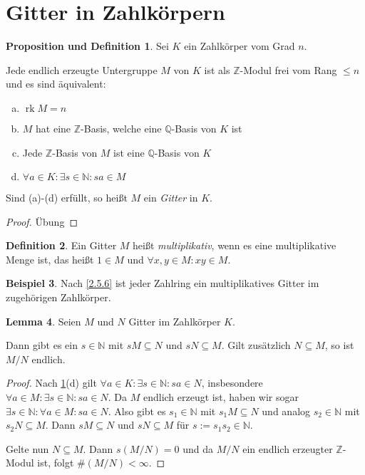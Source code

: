 \documentclass[
twoside=semi,
fontsize=12,
DIV=12, 
cleardoublepage=current,
leqno,
headings=optiontoheadandtoc, 
toc=idx
]{scrbook}
\newcommand{\N}{\mathbb{N}}
\newcommand{\Z}{\mathbb{Z}}
\newcommand{\Q}{\mathbb{Q}}
\DeclareMathOperator{\rk}{rk}
\theoremstyle{definition}
\newtheorem{definition}{Definition}[section]
\newtheorem{beispiel}[definition]{Beispiel}
\newtheorem{lemma}[definition]{Lemma}
\newtheorem{prop-def}[definition]{Proposition und Definition}
\begin{document}
 	\section{Gitter in Zahlk\"orpern}
 	\begin{prop-def}\label{3.1.1}
 		Sei $K$ ein Zahlk\"orper vom Grad $n$. 
 		
 		Jede endlich erzeugte Untergruppe $M$ von $K$ ist als $\Z$-Modul frei vom Rang $\leq n$ und es sind \"aquivalent:
 		\begin{enumerate}[(a)]
 			\item $\rk M = n$
 			\item $M$ hat eine $\Z$-Basis, welche eine $\Q$-Basis von $K$ ist
 			\item Jede $\Z$-Basis von $M$ ist eine $\Q$-Basis von $K$  
 			\item $\forall a \in K: \exists s \in \N: sa \in M$
 		\end{enumerate}
 		
 		Sind (a)-(d) erf\"ullt, so hei\ss t $M$ ein \emph{Gitter} in $K$.
 		\begin{proof}
 			\"Ubung
 		\end{proof}
 	\end{prop-def}
 
 	\begin{definition}\label{3.1.2}
 		Ein Gitter $M$ hei\ss t \emph{multiplikativ}, wenn es eine multiplikative Menge ist, das hei\ss t $1 \in M$ und $\forall x,y \in M: xy \in M$.
 	\end{definition}
 
 	\begin{beispiel}\label{3.1.3}
 		Nach \ref{2.5.6} ist jeder Zahlring ein multiplikatives Gitter im zugeh\"origen Zahlk\"orper.
 	\end{beispiel}
 
 	\begin{lemma}\label{3.1.4}
 		Seien $M$ und $N$ Gitter im Zahlk\"orper $K$. 
 		
 		Dann gibt es ein $s \in \N$ mit $sM \subseteq N$ und $sN \subseteq M$. Gilt zus\"atzlich $N \subseteq M$, so ist $M/N$ endlich.
 		
 		\begin{proof}
 			Nach \ref{3.1.1}(d) gilt $\forall a \in K: \exists s \in \N: sa \in N$, insbesondere $\forall a \in M: \exists s \in \N: sa \in N$. Da $M$ endlich erzeugt ist, haben wir sogar 
 			$\exists s \in \N: \forall a \in M: sa \in N$. Also gibt es $s_1 \in \N$ mit $s_1M \subseteq N$ und analog $s_2 \in \N$ mit $s_2N \subseteq M$. Dann $sM \subseteq N$ und $sN \subseteq M$ f\"ur $s:= s_1s_2 \in \N$.
 			
 			Gelte nun $N \subseteq M$. Dann $s(M/N) = 0$ und da $M/N$ ein endlich erzeugter $\Z$-Modul ist, folgt $\#(M/N) < \infty$.
 		\end{proof}
 	\end{lemma}
 
\end{document}
